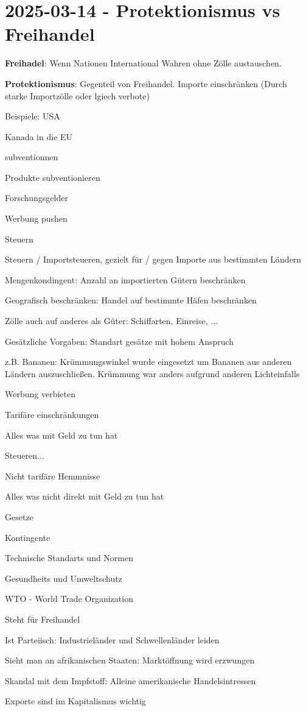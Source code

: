\section{2025-03-14 - Protektionismus vs Freihandel}

\startitemize[packed]
\item {\bf Freihadel}: Wenn Nationen International Wahren ohne Zölle austauschen.
\item {\bf Protektionismus}: Gegenteil von Freihandel. Importe einschränken (Durch starke Importzölle oder lgiech verbote)
\startitemize[packed]
\item Beispiele: USA
\stopitemize
\item Kanada in die EU
\item subventionnen
\startitemize[packed]
\item {} Produkte subventionieren
\item Forschungsgelder
\item Werbung pushen
\stopitemize
\item Steuern
\startitemize[packed]
\item Steuern / Importsteueren, gezielt für / gegen Importe aus bestimmten Ländern
\item Mengenkondingent: Anzahl an importierten Gütern beschränken
\item Geografisch beschränken: Handel auf bestimmte Häfen beschränken
\item Zölle auch auf anderes als Güter: Schiffarten, Einreise, ...
\item Gesätzliche Vorgaben: Standart gesätze mit hohem Anspruch
\startitemize[packed]
\item z.B. Bananen: Krümmungswinkel wurde eingesetzt um Bananen aus anderen Ländern auszuschließen. Krümmung war anders aufgrund anderen Lichteinfalls 
\stopitemize
\item Werbung verbieten
\stopitemize
\item Tarifäre einschränkungen
\startitemize[packed]
\item Alles was mit Geld zu tun hat
\item Steueren...
\stopitemize
\item Nicht tarifäre Hemmnisse
\startitemize[packed]
\item Alles was nicht direkt mit Geld zu tun hat
\item Gesetze
\item Kontingente
\item Technische Standarts und Normen
\item Gesundheits und Umweltschutz
\stopitemize
\item WTO - World Trade Organization
\startitemize[packed]
\item Steht für Freihandel
\item Ist Parteiisch: Industrieländer und Schwellenländer leiden
\item Sieht man an afrikanischen Staaten: Marktöffnung wird erzwungen
\item Skandal mit dem Impfstoff: Alleine amerikanische Handelsintressen
\stopitemize
\item Exporte sind im Kapitalismus wichtig
\stopitemize

